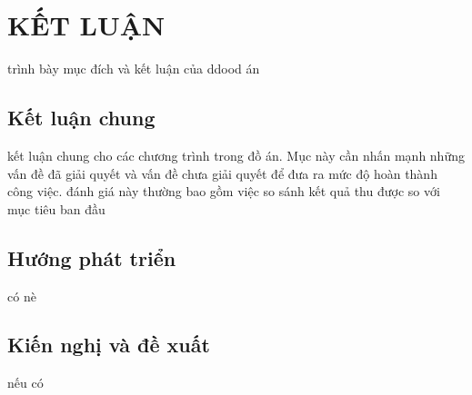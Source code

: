 \section*{KẾT LUẬN}
trình bày mục đích và kết luận của ddood án
\subsection{Kết luận chung}
kết luận chung cho các chương trình trong đồ án. Mục này cần nhấn mạnh những vấn đề đã giải quyết và vấn đề chưa giải quyết để đưa ra mức độ hoàn thành công việc. đánh giá này thường bao gồm việc so sánh kết quả thu được so với mục tiêu ban đầu
\subsection*{Hướng phát triển}
có nè
\subsection*{Kiến nghị và đề xuất}
nếu có